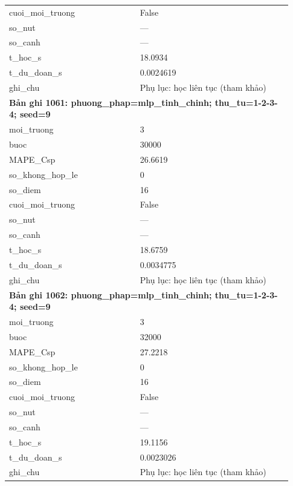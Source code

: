 \begin{longtable}{p{0.43\linewidth}p{0.50\linewidth}}
cuoi\_\allowbreak moi\_\allowbreak truong & False \\
so\_\allowbreak nut & — \\
so\_\allowbreak canh & — \\
t\_\allowbreak hoc\_\allowbreak s & 18.0934 \\
t\_\allowbreak du\_\allowbreak doan\_\allowbreak s & 0.0024619 \\
ghi\_\allowbreak chu & Phụ lục: học liên tục (tham khảo) \\
\midrule
\multicolumn{2}{p{0.95\linewidth}}{\textbf{Bản ghi 1061: phuong\_phap=mlp\_tinh\_chinh; thu\_tu=1-2-3-4; seed=9}} \\
moi\_\allowbreak truong & 3 \\
buoc & 30000 \\
MAPE\_\allowbreak Csp & 26.6619 \\
so\_\allowbreak khong\_\allowbreak hop\_\allowbreak le & 0 \\
so\_\allowbreak diem & 16 \\
cuoi\_\allowbreak moi\_\allowbreak truong & False \\
so\_\allowbreak nut & — \\
so\_\allowbreak canh & — \\
t\_\allowbreak hoc\_\allowbreak s & 18.6759 \\
t\_\allowbreak du\_\allowbreak doan\_\allowbreak s & 0.0034775 \\
ghi\_\allowbreak chu & Phụ lục: học liên tục (tham khảo) \\
\midrule
\multicolumn{2}{p{0.95\linewidth}}{\textbf{Bản ghi 1062: phuong\_phap=mlp\_tinh\_chinh; thu\_tu=1-2-3-4; seed=9}} \\
moi\_\allowbreak truong & 3 \\
buoc & 32000 \\
MAPE\_\allowbreak Csp & 27.2218 \\
so\_\allowbreak khong\_\allowbreak hop\_\allowbreak le & 0 \\
so\_\allowbreak diem & 16 \\
cuoi\_\allowbreak moi\_\allowbreak truong & False \\
so\_\allowbreak nut & — \\
so\_\allowbreak canh & — \\
t\_\allowbreak hoc\_\allowbreak s & 19.1156 \\
t\_\allowbreak du\_\allowbreak doan\_\allowbreak s & 0.0023026 \\
ghi\_\allowbreak chu & Phụ lục: học liên tục (tham khảo) \\

\end{longtable}
